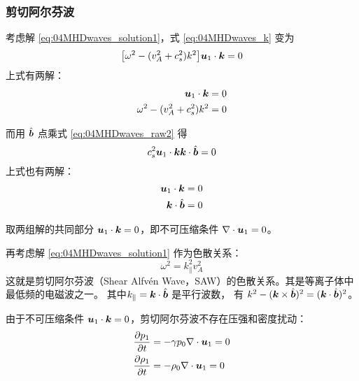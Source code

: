 \subsubsection{剪切阿尔芬波}

考虑解 \ref{eq:04MHDwaves_solution1}，式 \ref{eq:04MHDwaves_k} 变为
\begin{equation}
\big[\omega^2 - (v_A^2 + c_s^2) k^2 \big] \bm{u}_1 \cdot \bm{k} = 0
\end{equation}
上式有两解：
\begin{subequations}\begin{align}
\bm{u}_1 \cdot \bm{k} &= 0 \\
\omega^2 - (v_A^2 + c_s^2) k^2 &= 0
\end{align}\end{subequations}

而用 $\hat{\bm{b}}$ 点乘式 \ref{eq:04MHDwaves_raw2} 得
\begin{equation}
c_s^2 \bm{u}_1 \cdot \bm{k} \bm{k} \cdot \hat{\bm{b}} = 0
\end{equation}
上式也有两解：
\begin{subequations}\begin{align}
\bm{u}_1 \cdot \bm{k} &= 0 \\
\bm{k} \cdot \hat{\bm{b}} &= 0
\end{align}\end{subequations}

取两组解的共同部分 $\bm{u}_1 \cdot \bm{k} = 0$，即不可压缩条件 $\nabla \cdot {\bm{u}_1} = 0$。

再考虑解 \ref{eq:04MHDwaves_solution1} 作为色散关系：
\begin{equation} \label{eq:04MHDwaves_SAW}
\omega^2 = k_\parallel^2 v_A^2
\end{equation}
这就是剪切阿尔芬波（Shear Alfvén Wave，SAW）的色散关系。其是等离子体中最低频的电磁波之一。
其中$k_\parallel = \bm{k} \cdot \hat{\bm{b}}$ 是平行波数，
有 $k^2 - (\bm{k} \times \hat{\bm{b}})^2 = (\bm{k} \cdot \hat{\bm{b}})^2$。

由于不可压缩条件 $\bm{u}_1 \cdot \bm{k} = 0$，剪切阿尔芬波不存在压强和密度扰动：
\begin{subequations}\begin{align}
\frac{\partial {p_1}}{\partial {t}} &= - \gamma p_0 \nabla \cdot {\bm{u}_1} = 0 \\
\frac{\partial {\rho_1}}{\partial {t}} &= - \rho_0 \nabla \cdot {\bm{u}_1} = 0
\end{align}\end{subequations}

